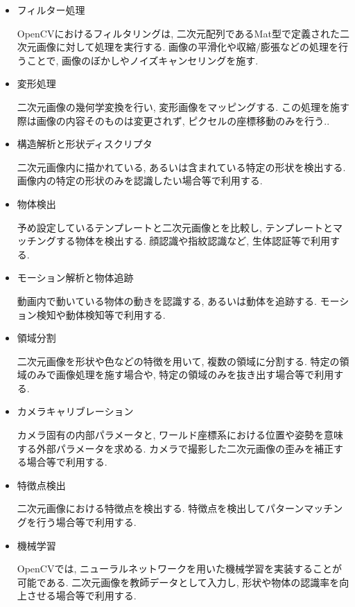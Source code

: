 \begin{itemize}
\item フィルター処理

OpenCVにおけるフィルタリングは, 二次元配列であるMat型で定義された二次元画像に対して処理を実行する.
画像の平滑化や収縮/膨張などの処理を行うことで, 画像のぼかしやノイズキャンセリングを施す.

\item 変形処理

二次元画像の幾何学変換を行い, 変形画像をマッピングする.
この処理を施す際は画像の内容そのものは変更されず, ピクセルの座標移動のみを行う..

\item 構造解析と形状ディスクリプタ

二次元画像内に描かれている, あるいは含まれている特定の形状を検出する.
画像内の特定の形状のみを認識したい場合等で利用する.

\item 物体検出

予め設定しているテンプレートと二次元画像とを比較し, テンプレートとマッチングする物体を検出する.
顔認識や指紋認識など, 生体認証等で利用する.

\item モーション解析と物体追跡

動画内で動いている物体の動きを認識する, あるいは動体を追跡する.
モーション検知や動体検知等で利用する.

\item 領域分割

二次元画像を形状や色などの特徴を用いて, 複数の領域に分割する.
特定の領域のみで画像処理を施す場合や, 特定の領域のみを抜き出す場合等で利用する.

\item カメラキャリブレーション

カメラ固有の内部パラメータと, ワールド座標系における位置や姿勢を意味する外部パラメータを求める.
カメラで撮影した二次元画像の歪みを補正する場合等で利用する.

\item 特徴点検出

二次元画像における特徴点を検出する.
特徴点を検出してパターンマッチングを行う場合等で利用する.

\item 機械学習

OpenCVでは, ニューラルネットワークを用いた機械学習を実装することが可能である.
二次元画像を教師データとして入力し, 形状や物体の認識率を向上させる場合等で利用する.
\end{itemize}

